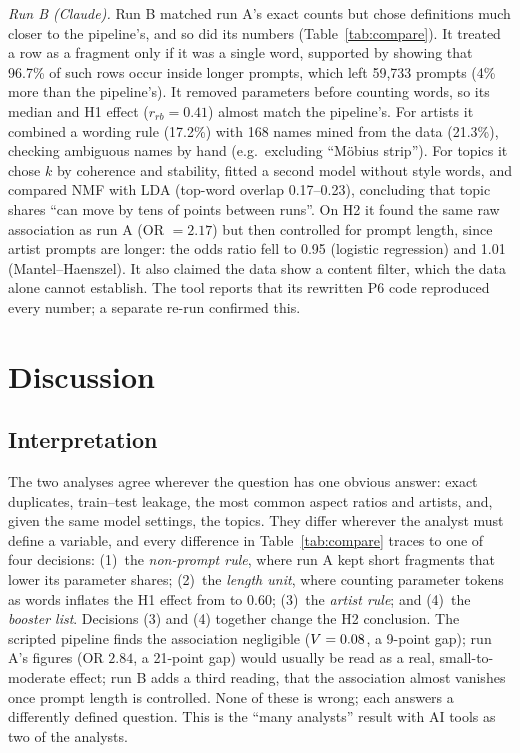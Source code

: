 \documentclass[conference]{IEEEtran}
\begin{document}
\textit{Run B (Claude).} Run B matched run A's exact counts but chose definitions much closer to the pipeline's, and so did its numbers
(Table~\ref{tab:compare}). It treated a row as a fragment only if it was a
single word, supported by showing that 96.7\% of such rows occur inside
longer prompts, which left 59,733 prompts (4\% more than the pipeline's). It removed
parameters before counting words, so its median and H1 effect
($r_{rb}=0.41$) almost match the pipeline's. For artists it combined a wording rule
(17.2\%) with 168 names mined from the data (21.3\%), checking ambiguous
names by hand (e.g.\ excluding ``M\"obius strip''). For topics it chose $k$
by coherence and stability, fitted a second model without style words, and
compared NMF with LDA (top-word overlap 0.17--0.23), concluding that topic
shares ``can move by tens of points between runs''. On H2 it found the same
raw association as run A (OR $=2.17$) but then controlled for prompt
length, since artist prompts are longer: the odds ratio fell to 0.95
(logistic regression) and 1.01 (Mantel--Haenszel). It also claimed the data
show a content filter, which the data alone cannot establish. The tool reports that its rewritten P6 code reproduced every number; a separate re-run confirmed this.

\section{Discussion}

\subsection{Interpretation}
The two analyses agree wherever the question has one obvious answer:
exact duplicates, train--test leakage, the most common aspect ratios and
artists, and, given the same model settings, the topics. They differ
wherever the analyst must define a variable, and every difference in
Table~\ref{tab:compare} traces to one of four decisions: (1)~the
\emph{non-prompt rule}, where run A kept short fragments that lower its
parameter shares; (2)~the \emph{length unit}, where counting parameter
tokens as words inflates the H1 effect from \HOneRankBiserial{} to 0.60;
(3)~the \emph{artist rule}; and (4)~the \emph{booster list}. Decisions (3)
and (4) together change the H2 conclusion. The scripted pipeline finds the association negligible ($V=0.08$, a 9-point gap); run A's figures (OR $2.84$,
a 21-point gap) would usually be read as a real, small-to-moderate effect;
run B adds a third reading, that the association almost vanishes once
prompt length is controlled. None of these is wrong; each answers a
differently defined question. This is the ``many analysts'' result
\cite{silberzahnManyAnalysts2018} with AI tools as two of the analysts.
\end{document}
